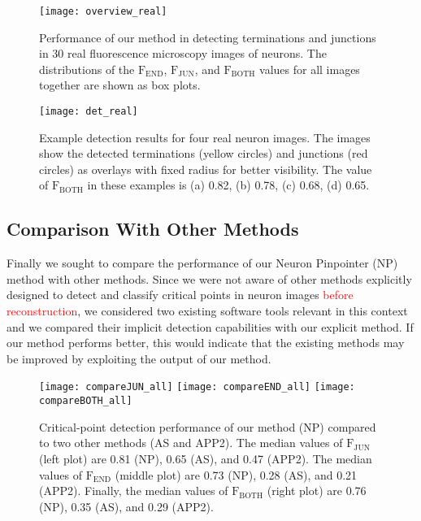\documentclass[twocolumn,natbib]{svjour3}
\newcommand{\marked}[1]{\textcolor{red}{#1}}
\begin{document}
\begin{figure}[!t]
\centering
\texttt{[image: overview\_real]}
\caption{Performance of our method in detecting terminations and junctions in 30 real fluorescence microscopy images of neurons. The distributions of the $\textrm{F}_\textrm{END}$, $\textrm{F}_\textrm{JUN}$, and $\textrm{F}_\textrm{BOTH}$ values for all images together are shown as box plots.}
\label{fig:results-real}
\end{figure}

\begin{figure}[!t]
\centering
\texttt{[image: det\_real]}
\caption{Example detection results for four real neuron images. The images show the detected terminations (yellow circles) and junctions (red circles) as overlays with fixed radius for better visibility. The value of $\textrm{F}_\textrm{BOTH}$ in these examples is (a) 0.82, (b) 0.78, (c) 0.68, (d) 0.65.}
\label{fig:real-det}
\end{figure}

\subsection{Comparison With Other Methods}
\label{subsec:comparison}
Finally we sought to compare the performance of our Neuron Pinpointer (NP) method with other methods. Since we were not aware of other methods explicitly designed to detect and classify critical points in neuron images \marked{before reconstruction}, we considered two existing software tools relevant in this context and we compared their implicit detection capabilities with our explicit method. If our method performs better, this would indicate that the existing methods may be improved by exploiting the output of our method.

\begin{figure*}
\texttt{[image: compareJUN\_all]}\hfill
\texttt{[image: compareEND\_all]}\hfill
\texttt{[image: compareBOTH\_all]}
\caption{Critical-point detection performance of our method (NP) compared to two other methods (AS and APP2). The median values of $\textrm{F}_{\textrm{JUN}}$ (left plot) are 0.81 (NP), 0.65 (AS), and 0.47 (APP2). The median values of $\textrm{F}_{\textrm{END}}$ (middle plot) are 0.73 (NP), 0.28 (AS), and 0.21 (APP2). Finally, the median values of $\textrm{F}_{\textrm{BOTH}}$ (right plot) are 0.76 (NP), 0.35 (AS), and 0.29 (APP2).}
\label{fig:comparison-all}
\end{figure*}
\end{document}
